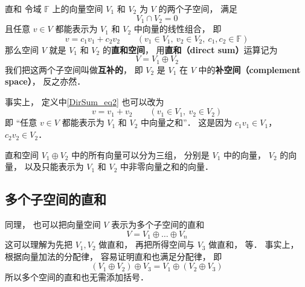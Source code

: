 
\begin{issues}
\issueTODO
\end{issues}

\begin{definition}{直和}\label{DirSum_def1}
令域 $\mathbb F$ 上的向量空间 $V_1$ 和 $V_2$ 为 $V$ 的两个子空间， 满足
\begin{equation}
V_1 \cap V_2 = \qty{0}
\end{equation}
且任意 ${v} \in V$ 都能表示为 $V_1$ 和 $V_2$ 中向量的线性组合， 即
\begin{equation}\label{DirSum_eq2}
{v} = c_1 {v_1} + c_2 {v_2}
\qquad
({v_1} \in V_1,\ {v_2} \in V_2,\ c_1, c_2 \in \mathbb F)
\end{equation}
那么空间 $V$ 就是 $V_1$ 和 $V_2$ 的\textbf{直和空间}， 用\textbf{直和（direct sum）}运算记为
\begin{equation}
V = V_1 \oplus V_2
\end{equation}
我们把这两个子空间叫做\textbf{互补的}， 即 $V_2$ 是 $V_1$ 在 $V$ 中的\textbf{补空间（complement space）}， 反之亦然．
\end{definition}

事实上， 定义中\autoref{DirSum_eq2} 也可以改为
\begin{equation}
{v} = {v_1} + {v_2} \qquad
({v_1} \in V_1,\ {v_2} \in V_2)
\end{equation}
即 “任意 ${v} \in V$ 都能表示为 $V_1$ 和 $V_2$ 中向量之和”． 这是因为 $c_1 v_1 \in V_1$， $c_2 v_2 \in V_2$．

直和空间 $V_1 \oplus V_2$ 中的所有向量可以分为三组， 分别是 $V_1$ 中的向量， $V_2$ 的向量， 以及只能表示为 $V_1$ 和 $V_2$ 中非零向量之和的向量．

\subsection{多个子空间的直和}
同理， 也可以把向量空间 $V$ 表示为多个子空间的直和
\begin{equation}
V = V_1 \oplus \dots \oplus V_n
\end{equation}
这可以理解为先把 $V_1, V_2$ 做直和， 再把所得空间与 $V_3$ 做直和， 等． 事实上， 根据向量加法的分配律， 容易证明直和也满足分配律， 即
\begin{equation}
(V_1 \oplus V_2) \oplus V_3 = V_1 \oplus (V_2 \oplus V_3)
\end{equation}
所以多个空间的直和也无需添加括号．

